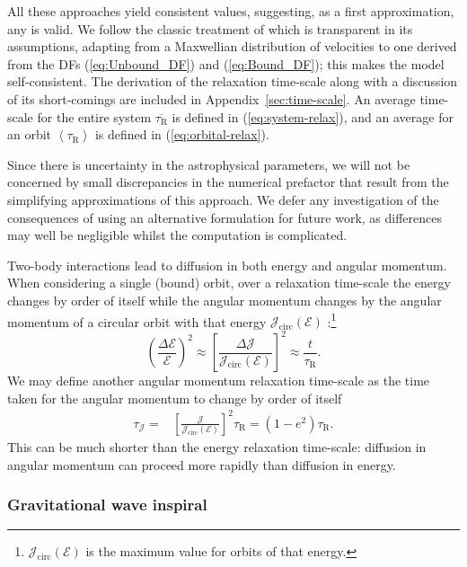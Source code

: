 \documentclass[useAMS,usedcolumn,usegraphicx,usenatbib]{mn2e}
\newcommand{\eqnref}[1]{(\ref{eq:#1})}
\newcommand{\apref}[1]{Appendix~\ref{sec:#1}}
\newcommand{\sub}[1]{\ensuremath{_\mathrm{#1}}}
\begin{document}
All these approaches yield consistent values, suggesting, as a first approximation, any is valid. We follow the classic treatment of \citet[chapter 2]{Chandrasekhar1960} which is transparent in its assumptions, adapting from a Maxwellian distribution of velocities to one derived from the DFs \eqnref{Unbound_DF} and \eqnref{Bound_DF}; this makes the model self-consistent. The derivation of the relaxation time-scale along with a discussion of its short-comings are included in \apref{time-scale}. An average time-scale for the entire system $\overline{\tau\sub{R}}$ is defined in \eqnref{system-relax}, and an average for an orbit $\left\langle\tau\sub{R}\right\rangle$ is defined in \eqnref{orbital-relax}. 

Since there is uncertainty in the astrophysical parameters, we will not be concerned by small discrepancies in the numerical prefactor that result from the simplifying approximations of this approach. We defer any investigation of the consequences of using an alternative formulation for future work, as differences may well be negligible whilst the computation is complicated.

Two-body interactions lead to diffusion in both energy and angular momentum. When considering a single (bound) orbit, over a relaxation time-scale the energy changes by order of itself while the angular momentum changes by the angular momentum of a circular orbit with that energy $\mathcal{J}\sub{circ}(\mathcal{E})$ \citep{Lightman1977, Rauch1996, Hopman2005, Madigan2011}:\footnote{$\mathcal{J}\sub{circ}(\mathcal{E})$ is the maximum value for orbits of that energy.}
\begin{equation}
\left(\frac{\Delta\mathcal{E}}{\mathcal{E}}\right)^{2} \approx \left[\frac{\Delta \mathcal{J}}{\mathcal{J}\sub{circ}(\mathcal{E})}\right]^{2} \approx \frac{t}{\tau\sub{R}}.
\label{eq:diffuse-relax}
\end{equation}
We may define another angular momentum relaxation time-scale as the time taken for the angular momentum to change by order of itself \citep{Merritt2011}
\begin{align}
\tau_\mathcal{J} = {} & \left[\frac{\mathcal{J}}{\mathcal{J}\sub{circ}(\mathcal{E})}\right]^2\tau\sub{R} = \left(1 - e^2\right) \tau\sub{R}.
\label{eq:J-time}
\end{align}
This can be much shorter than the energy relaxation time-scale: diffusion in angular momentum can proceed more rapidly than diffusion in energy.

\subsubsection{Gravitational wave inspiral}\label{sec:GW-in}
\end{document}
